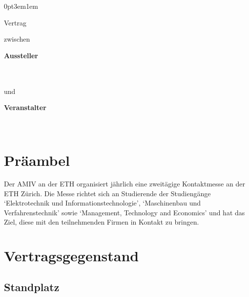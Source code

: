 \titlespacing*{\section}
{0pt}{3em}{1em}

\renewcommand*{\thesection}{\S\ \arabic{section}}

\begin{center}
\amivfairtitle
\bigbreak
\begin{huge}
Vertrag
\end{huge}
\medbreak
zwischen
\bigbreak
\end{center}

\vspace{2cm}

\begin{minipage}[t]{0.4\textwidth}
\textbf{Aussteller}
\bigbreak
\companyname\\
\companyaddress\\
\companycity\\
\companycountry
\end{minipage}%
\begin{minipage}[t]{0.2\textwidth}
und
\end{minipage}%
\begin{minipage}[t]{0.4\textwidth}
\textbf{Veranstalter}
\bigbreak
\amivname\\
\amivaddress\\
\amivpostal\ \amivcity
\end{minipage}

\vfill
\section*{Präambel}

Der AMIV an der ETH organisiert jährlich eine zweitägige Kontaktmesse an der
ETH Zürich. Die Messe richtet sich an Studierende der Studiengänge
`Elektrotechnik und Informationstechnologie',
`Maschinenbau und Verfahrenstechnik' sowie
`Management, Technology and Economics' und hat das Ziel, diese mit den
teilnehmenden Firmen in Kontakt zu bringen.

\newpage
\section{Vertragsgegenstand}
\subsection{Standplatz}

